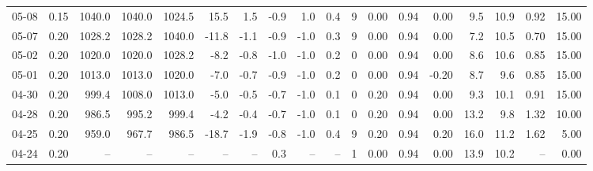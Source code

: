 \begin{threeparttable}
{\begin{tabular}{lrrrrrrrrrrrrrrrrr}
  05-08 &     0.15 & 1040.0 & 1040.0 & 1024.5 &       15.5 &            1.5 &                      -0.9 &                      1.0 &                 0.4 &              9 &       0.00 &      0.94 &           0.00 &              9.5 &                10.9 &            0.92 &                  15.00 \\
  05-07 &     0.20 & 1028.2 & 1028.2 & 1040.0 &      -11.8 &           -1.1 &                      -0.9 &                     -1.0 &                 0.3 &              9 &       0.00 &      0.94 &           0.00 &              7.2 &                10.5 &            0.70 &                  15.00 \\
  05-02 &     0.20 & 1020.0 & 1020.0 & 1028.2 &       -8.2 &           -0.8 &                      -1.0 &                     -1.0 &                 0.2 &              0 &       0.00 &      0.94 &           0.00 &              8.6 &                10.6 &            0.85 &                  15.00 \\
  05-01 &     0.20 & 1013.0 & 1013.0 & 1020.0 &       -7.0 &           -0.7 &                      -0.9 &                     -1.0 &                 0.2 &              0 &       0.00 &      0.94 &          -0.20 &              8.7 &                 9.6 &            0.85 &                  15.00 \\
  04-30 &     0.20 &  999.4 & 1008.0 & 1013.0 &       -5.0 &           -0.5 &                      -0.7 &                     -1.0 &                 0.1 &              0 &       0.20 &      0.94 &           0.00 &              9.3 &                10.1 &            0.91 &                  15.00 \\
  04-28 &     0.20 &  986.5 &  995.2 &  999.4 &       -4.2 &           -0.4 &                      -0.7 &                     -1.0 &                 0.1 &              0 &       0.20 &      0.94 &           0.00 &             13.2 &                 9.8 &            1.32 &                  10.00 \\
  04-25 &     0.20 &  959.0 &  967.7 &  986.5 &      -18.7 &           -1.9 &                      -0.8 &                     -1.0 &                 0.4 &              9 &       0.20 &      0.94 &           0.20 &             16.0 &                11.2 &            1.62 &                   5.00 \\
  04-24 &     0.20 &     -- &     -- &     -- &         -- &             -- &                       0.3 &                       -- &                  -- &              1 &       0.00 &      0.94 &           0.00 &             13.9 &                10.2 &              -- &                   0.00 \\

\end{tabular}}
\end{threeparttable}
